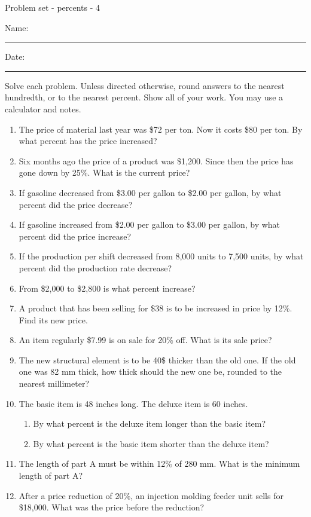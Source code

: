 \documentclass[12pt]{article}
\begin{document}
\pagestyle{empty} %
\begin{center}
          Problem set - percents - 4 \\[0.5in]
\end{center}
Name: \rule{4in}{0.005in} Date: \rule{1.5in}{0.005in} 
  \vspace{0.25in}

Solve each problem. Unless directed otherwise, round answers to the nearest hundredth, or to the nearest percent. Show all of your work. You may use a calculator and notes. 
\begin{enumerate}
\newcommand{\spacing}{\vspace{0.70in}}
\item The price of material last year was \$72 per ton. Now it costs \$80 per ton. By what percent has the price increased? 
\spacing

\item Six months ago the price of a product was \$1,200. Since then the price has gone down by 25\%. What is the current price? 
\spacing

\item If gasoline decreased from \$3.00 per gallon to \$2.00 per gallon, by what percent did the price decrease? 
\spacing

\item If gasoline increased from \$2.00 per gallon to \$3.00 per gallon, by what percent did the price increase? 
  \vspace{0.50in}

\item If the production per shift decreased from 8,000 units to 7,500 units, by what percent did the production rate decrease? 
\spacing

\item From \$2,000 to \$2,800 is what percent increase? 
\spacing

\item A product that has been selling for \$38 is to be increased in price by 12\%. Find its new price. 
\spacing

\item An item regularly \$7.99 is on sale for 20\% off. What is its sale price? 
\spacing

\item The new structural element is to be 40\$ thicker than the old one. If the old one was 82 mm thick, how thick should the new one be, rounded to the nearest millimeter? 
\spacing

\item The basic item is 48 inches long. The deluxe item is 60 inches. 
	\begin{enumerate}
		\item By what percent is the deluxe item longer than the basic item? 
		\spacing
		\item By what percent is the basic item shorter than the deluxe item? 
		\spacing
	\end{enumerate}

\item The length of part A must be within 12\% of 280 mm. What is the minimum length of part A? 
\spacing

\item After a price reduction of 20\%, an injection molding feeder unit sells for \$18,000. What was the price before the reduction? 
\spacing

\end{enumerate}
\end{document}
